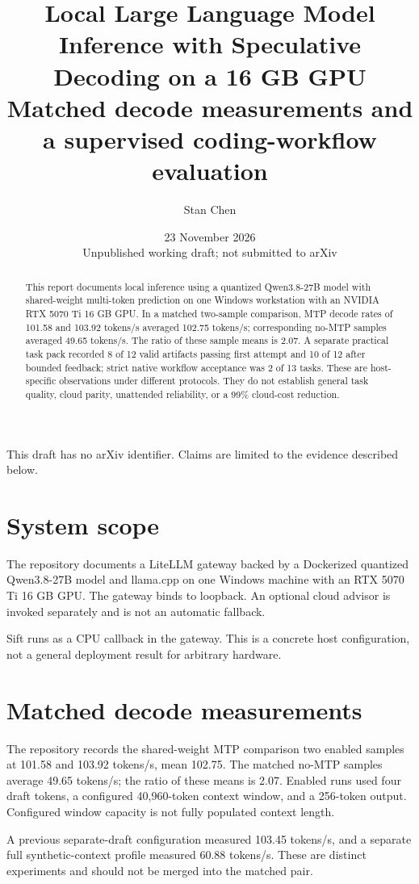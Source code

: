 \documentclass[11pt]{article}
\title{Local Large Language Model Inference with Speculative Decoding on a 16 GB GPU\\\large Matched decode measurements and a supervised coding-workflow evaluation}
\author{Stan Chen}
\date{23 November 2026\\[4pt]\small Unpublished working draft; not submitted to arXiv}
\begin{document}
\maketitle
\begin{center}\small This draft has no arXiv identifier. Claims are limited to the evidence described below.\end{center}
\begin{abstract}
This report documents local inference using a quantized Qwen3.8-27B model with shared-weight multi-token prediction \cite{r1} on one Windows workstation with an NVIDIA RTX 5070 Ti 16 GB GPU. In a matched two-sample comparison, MTP decode rates of 101.58 and 103.92 tokens/s averaged 102.75 tokens/s; corresponding no-MTP samples averaged 49.65 tokens/s. The ratio of these sample means is 2.07. A separate practical task pack recorded 8 of 12 valid artifacts passing first attempt and 10 of 12 after bounded feedback; strict native workflow acceptance was 2 of 13 tasks. These are host-specific observations under different protocols. They do not establish general task quality, cloud parity, unattended reliability, or a 99\% cloud-cost reduction.
\end{abstract}
\section{System scope}
The repository documents a LiteLLM gateway backed by a Dockerized quantized Qwen3.8-27B model and llama.cpp \cite{r2} on one Windows machine with an RTX 5070 Ti 16 GB GPU. The gateway binds to loopback. An optional cloud advisor is invoked separately and is not an automatic fallback.\par
Sift runs as a CPU callback in the gateway. This is a concrete host configuration, not a general deployment result for arbitrary hardware.\par
\section{Matched decode measurements}
The repository records \cite{r3} the shared-weight MTP comparison two enabled samples at 101.58 and 103.92 tokens/s, mean 102.75. The matched no-MTP samples average 49.65 tokens/s; the ratio of these means is 2.07. Enabled runs used four draft tokens, a configured 40,960-token context window, and a 256-token output. Configured window capacity is not fully populated context length.\par
A previous separate-draft configuration measured 103.45 tokens/s, and a separate full synthetic-context profile measured 60.88 tokens/s. These are distinct experiments and should not be merged into the matched pair.\par
\end{document}
